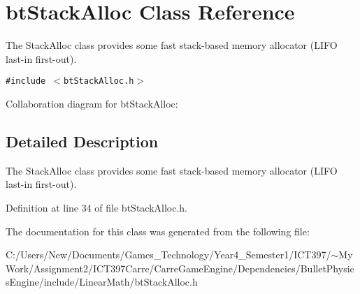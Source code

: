 \hypertarget{classbt_stack_alloc}{
\section{btStackAlloc Class Reference}
\label{classbt_stack_alloc}
}
The StackAlloc class provides some fast stack-based memory allocator (LIFO last-in first-out).  


{\tt \#include $<$btStackAlloc.h$>$}

Collaboration diagram for btStackAlloc:

\subsection{Detailed Description}
The StackAlloc class provides some fast stack-based memory allocator (LIFO last-in first-out). 

Definition at line 34 of file btStackAlloc.h.

The documentation for this class was generated from the following file:\begin{CompactItemize}
\item 
C:/Users/New/Documents/Games\_\-Technology/Year4\_\-Semester1/ICT397/$\sim$My Work/Assignment2/ICT397Carre/CarreGameEngine/Dependencies/BulletPhysicsEngine/include/LinearMath/btStackAlloc.h\end{CompactItemize}
